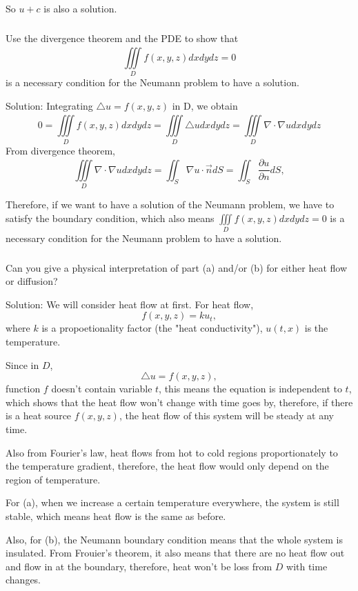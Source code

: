 \documentclass{article}
\begin{document}


		So $u+c$ is also a solution.

	\subsubsection{}
	Use the divergence theorem and the PDE to show that
\[
\iiint\limits_{D}^{} f(x,y,z)dxdydz=0
\]
	is a necessary condition for the Neumann problem to have a solution.
		
		Solution: Integrating $\triangle u = f(x,y,z)$ in D, we obtain
		\[0= \iiint\limits_{D}^{} f(x,y,z)dxdydz=\iiint\limits_{D}^{} \triangle u dxdydz=\iiint\limits_{D}^{} \nabla \cdot \nabla u dxdydz
		\]
		From divergence theorem,
		\[\iiint\limits_{D}^{} \nabla \cdot \nabla u dxdydz=\iint_{S}^{} \nabla u \cdot \vec{n}dS=\iint_{S}^{} \frac{\partial u}{\partial n}dS,
			\]

			Therefore, if we want to have a solution of the Neumann problem, we have to satisfy the boundary condition, which also means $ \iiint\limits_{D}^{} f(x,y,z)dxdydz=0$ is a necessary condition for the Neumann problem to have a solution.
		\subsubsection{}
	Can you give a physical interpretation of part (a) and/or (b) for either heat flow or diffusion?
		
		Solution: We will consider heat flow at first. For heat flow, \[f(x,y,z)=ku_{t},\]
		where $k$ is a propoetionality factor (the "heat conductivity"), $u(t,x)$ is the temperature.
        
		Since in $D$, \[\triangle u = f(x,y,z),\] function $f$ doesn't contain variable $t$, this means the equation is independent to $t$, which shows that the heat flow won't change with time goes by, therefore, if there is a heat source $f(x,y,z)$, the heat flow of this system will be steady at any time. 
		
		Also from Fourier's law, heat flows from hot to cold regions proportionately to the temperature gradient, therefore, the heat flow would only depend on the region of temperature.
         
		For (a), when we increase a certain temperature everywhere, the system is still stable, which means heat flow is the same as before. 

		Also, for (b), the Neumann boundary condition means that the whole system is insulated. From Frouier's theorem, it also means that there are no heat flow out and flow in at the boundary, therefore, heat won't be loss from $D$ with time changes.
\end{document}
